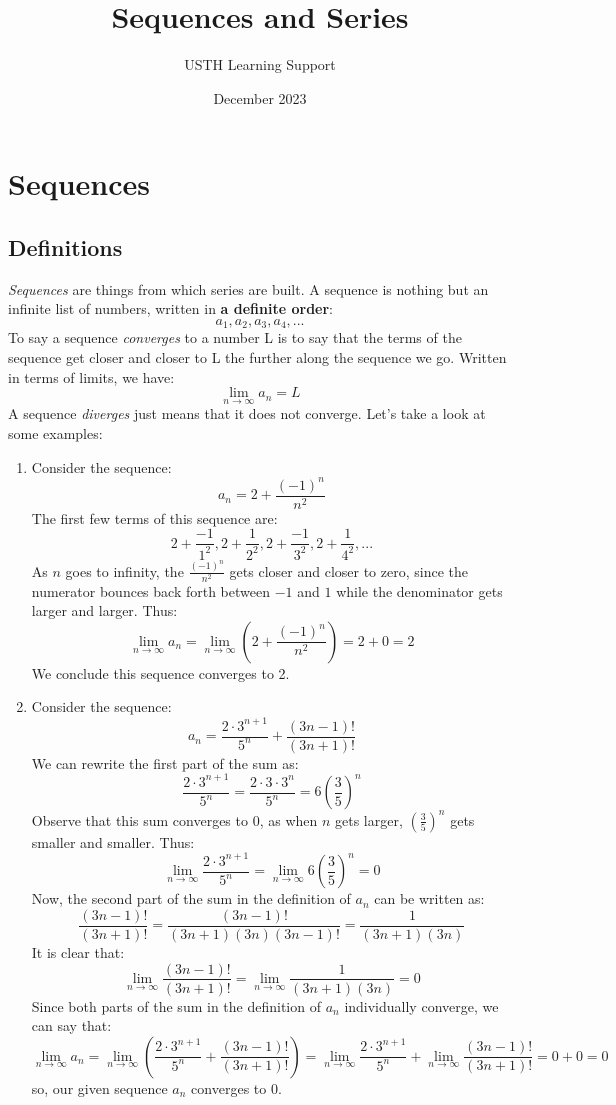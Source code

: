 \documentclass{article}
\title{Sequences and Series}
\author{USTH Learning Support }
\date{December 2023}
\begin{document}
\maketitle

\tableofcontents

\pagebreak
%
%
\section{Sequences}
\subsection{Definitions}
%
%
\textit{Sequences} are things from which series are built. A sequence is nothing but an infinite list of numbers, written in \textbf{a definite order}: $$ a_1, a_2, a_3, a_4,...$$
To say a sequence \textit{converges} to a number L is to say that the terms of the sequence get closer and closer to L the further along the sequence we go. Written in terms of limits, we have: 
$$ \lim_{n\to\infty} a_n = L$$
A sequence \textit{diverges} just means that it does not converge. Let's take a look at some examples:
%
%
\begin{enumerate}
    \item Consider the sequence: $$a_n = 2 + \frac{(-1)^n}{n^2}$$
    The first few terms of this sequence are: $$ 2 + \frac{-1}{1^2}, 2 + \frac{1}{2^2}, 2 + \frac{-1}{3^2}, 2 + \frac{1}{4^2}, ... $$
    As $n$ goes to infinity, the $\frac{(-1)^n}{n^2}$ gets closer and closer to zero, since the numerator bounces     back forth between $-1$ and $1$ while the denominator gets larger and larger. Thus: 
    $$\lim_{n\to\infty} a_n = \lim_{n\to\infty} \left(2 + \frac{(-1)^n}{n^2}\right) = 2 + 0 = 2$$
    We conclude this sequence converges to 2. 
    \item Consider the sequence: $$a_n = \frac{2\cdot3^{n+1}}{5^n} + \frac{(3n-1)!}{(3n+1)!}$$
    We can rewrite the first part of the sum as: $$\frac{2\cdot3^{n+1}}{5^n} = \frac{2\cdot3\cdot3^n}{5^n} = 6\left(\frac{3}{5}\right)^n$$
    Observe that this sum converges to 0, as when $n$ gets larger, $\left(\frac{3}{5}\right)^n$ gets smaller and smaller. Thus: 
    $$\lim_{n\to\infty} \frac{2\cdot3^{n+1}}{5^n} = \lim_{n\to\infty} 6\left(\frac{3}{5}\right)^n = 0 $$
    Now, the second part of the sum in the definition of $a_n$ can be written as: 
    $$\frac{(3n-1)!}{(3n+1)!} = \frac{(3n-1)!}{(3n+1)(3n)(3n-1)!} = \frac{1}{(3n+1)(3n)}$$
    It is clear that: 
    $$\lim_{n\to\infty}\frac{(3n-1)!}{(3n+1)!} = \lim_{n\to\infty}\frac{1}{(3n+1)(3n)} = 0 $$
    Since both parts of the sum in the definition of $a_n$ individually converge, we can say that: 
$$\lim_{n\to\infty} a_n = \lim_{n\to\infty} \left(\frac{2\cdot3^{n+1}}{5^n} + \frac{(3n-1)!}{(3n+1)!}\right) = \lim_{n\to\infty} \frac{2\cdot 3^{n+1}}{5^n} + \lim_{n\to\infty}\frac{(3n-1)!}{(3n+1)!} = 0 + 0 = 0 $$ 
so, our given sequence $a_n$ converges to 0.
 \end{enumerate}
\end{document}
